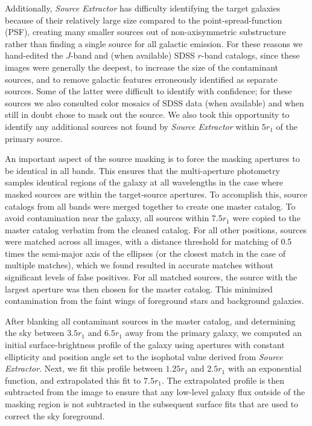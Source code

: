 \documentclass[traditabstract]{aa} %
\begin{document}
Additionally, {\it Source Extractor} has difficulty identifying the target
galaxies because of their relatively large size compared to the
point-spread-function (PSF), creating many smaller sources out of
non-axisymmetric substructure rather than finding a single source for all
galactic emission. For these reasons we hand-edited the $J$-band and (when
available) SDSS $r$-band catalogs, since these images were generally the
deepest, to increase the size of the contaminant sources, and to remove galactic
features erroneously identified as separate sources.  Some of the latter were
difficult to identify with confidence; for these sources we also consulted color
mosaics of SDSS data (when available) and when still in doubt chose to mask out
the source.  We also took this opportunity to identify any additional sources
not found by {\it Source Extractor} within $5r_1$ of the primary source.

An important aspect of the source masking is to force the masking apertures to
be identical in all bands. This ensures that the multi-aperture photometry
samples identical regions of the galaxy at all wavelengths in the case where
masked sources are within the target-source apertures. To accomplish this,
source catalogs from all bands were merged together to create one master
catalog. To avoid contamination near the galaxy, all sources within $7.5 r_1$
were copied to the master catalog verbatim from the cleaned catalog.  For all
other positions, sources were matched across all images, with a distance
threshold for matching of 0.5 times the semi-major axis of the ellipses (or the
closest match in the case of multiple matches), which we found resulted in
accurate matches without significant levels of false positives.  For all matched
sources, the source with the largest aperture was then chosen for the master
catalog.  This minimized contamination from the faint wings of foreground stars
and background galaxies.

After blanking all contaminant sources in the master catalog, and determining
the sky between $3.5 r_1$ and $6.5 r_1$ away from the primary galaxy, we
computed an initial surface-brightness profile of the galaxy using apertures
with constant ellipticity and position angle set to the isophotal value derived
from {\it Source Extractor}.  Next, we fit this profile between $1.25 r_1$ and
$2.5 r_1$ with an exponential function, and extrapolated this fit to $7.5 r_1$.
The extrapolated profile is then subtracted from the image to ensure that any
low-level galaxy flux outside of the masking region is not subtracted in the
subsequent surface fits that are used to correct the sky foreground.
\end{document}
